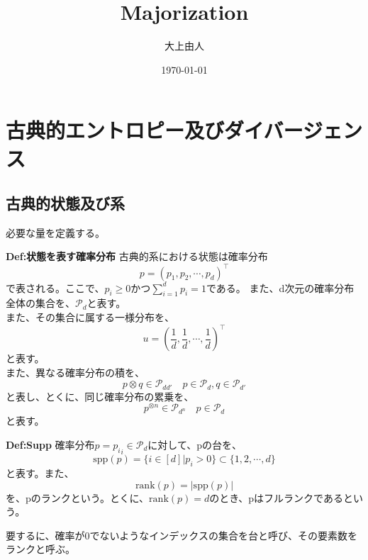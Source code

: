 \documentclass[a4paper,11pt]{jsarticle}
\numberwithin{equation}{section}
\begin{document}
\title{Majorization}
\author{大上由人}
\date{\today}
\maketitle

\section{古典的エントロピー及びダイバージェンス}
\subsection{古典的状態及び系}
必要な量を定義する。\\
\begin{itembox}[l]{\textbf{Def:状態を表す確率分布}}
    古典的系における状態は確率分布
    \begin{equation}
        p = (p_1, p_2, \cdots, p_d)^{\top}
    \end{equation}
    で表される。ここで、$p_i \geq 0$かつ$\sum_{i=1}^{d}p_i = 1$である。
    また、d次元の確率分布全体の集合を、$\mathcal{P}_d$と表す。\\
    また、その集合に属する一様分布を、
    \begin{equation}
        u = \left(\frac{1}{d}, \frac{1}{d}, \cdots, \frac{1}{d}\right)^{\top}
    \end{equation}
    と表す。\\
    また、異なる確率分布の積を、
    \begin{equation}
        p \otimes q \in \mathcal{P}_{dd'} \quad p \in \mathcal{P}_d, q \in \mathcal{P}_{d'}
    \end{equation}
    と表し、とくに、同じ確率分布の累乗を、
    \begin{equation}
        p^{\otimes n} \in \mathcal{P}_{d^n} \quad p \in \mathcal{P}_d
    \end{equation}
    と表す。
\end{itembox}

\begin{itembox}[l]{\textbf{Def:Supp}}
    確率分布$p ={p_i}_i \in \mathcal{P}_d$に対して、pの台を、
    \begin{equation}
        \text{spp}(p) = \{i \in [d] | p_i > 0\} \subset \{1, 2, \cdots, d\}
    \end{equation}
    と表す。また、
    \begin{equation}
        \text{rank}(p) = |\text{spp}(p)|
    \end{equation}
    を、pのランクという。とくに、$\text{rank}(p) = d$のとき、pはフルランクであるという。
\end{itembox}
要するに、確率が0でないようなインデックスの集合を台と呼び、その要素数をランクと呼ぶ。\\
\end{document}
